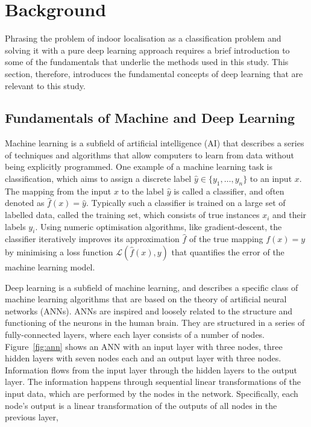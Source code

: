 \documentclass[a4paper]{article}
\begin{document}
\section{Background} %
\label{sec:background}

Phrasing the problem of indoor localisation as a classification problem and
solving it with a pure deep learning approach requires a brief introduction to
some of the fundamentals that underlie the methods used in this study. This
section, therefore, introduces the fundamental concepts of deep learning that
are relevant to this study.

\subsection{Fundamentals of Machine and Deep Learning}

Machine learning is a subfield of artificial intelligence (AI) that describes a
series of techniques and algorithms that allow computers to learn from data
without being explicitly programmed. One example of a machine learning task is
classification, which aims to assign a discrete label $\hat{y} \in \{y_1,
\ldots, y_n\}$ to an input $x$. The mapping from the input $x$ to the label
$\hat{y}$ is called a classifier, and often denoted as $\hat{f}(x) = \hat{y}$.
Typically such a classifier is trained on a large set of labelled data, called
the training set, which consists of true instances $x_i$ and their labels $y_i$.
Using numeric optimisation algorithms, like gradient-descent, the classifier
iteratively improves its approximation $\hat{f}$ of the true mapping $f(x) = y$
by minimising a loss function $\mathcal{L}(\hat{f}(x), y)$ that quantifies the
error of the machine learning model.

Deep learning is a subfield of machine learning, and describes a specific class
of machine learning algorithms that are based on the theory of artificial neural
networks (ANNs). ANNs are inspired and loosely related to the structure and
functioning of the neurons in the human brain. They are structured in a series
of fully-connected layers, where each layer consists of a number of nodes.
Figure~\ref{fig:ann} shows an ANN with an input layer with three nodes, three
hidden layers with seven nodes each and an output layer with three nodes.
Information flows from the input layer through the hidden layers to the output
layer. The information happens through sequential linear transformations of the
input data, which are performed by the nodes in the network. Specifically, each
node's output is a linear transformation of the outputs of all nodes in the
previous layer, 
\end{document}
